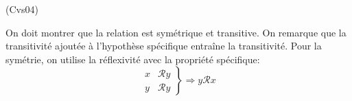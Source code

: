 \begin{tiny}(Cvs04)\end{tiny} On doit montrer que la relation est symétrique et transitive. On remarque que la transitivité ajoutée à l'hypothèse spécifique entraîne la transitivité.\newline
Pour la symétrie, on utilise la réflexivité avec la propriété spécifique:
\begin{displaymath}
  \left. 
  \begin{aligned}
    x &\mathcal{R} y \\ y &\mathcal{R} y
  \end{aligned}
\right\rbrace \Rightarrow y \mathcal{R} x
\end{displaymath}
